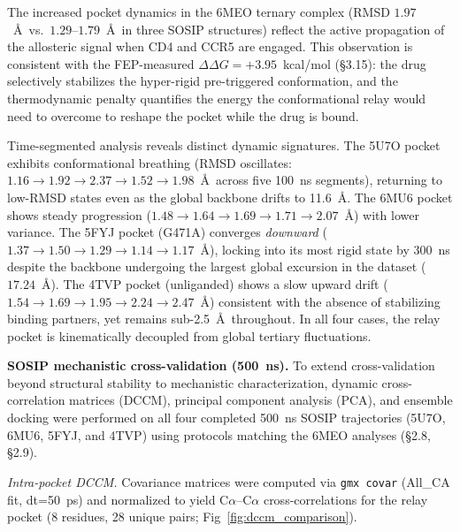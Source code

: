 \documentclass[11pt,a4paper]{article}
\begin{document}
The increased pocket dynamics in the 6MEO ternary complex (RMSD $1.97$~\AA\ vs.\ $1.29$--$1.79$~\AA\ in three SOSIP structures) reflect the active propagation of the allosteric signal when CD4 and CCR5 are engaged. This observation is consistent with the FEP-measured $\Delta\Delta G = +3.95$~kcal/mol (\S3.15): the drug selectively stabilizes the hyper-rigid pre-triggered conformation, and the thermodynamic penalty quantifies the energy the conformational relay would need to overcome to reshape the pocket while the drug is bound.

Time-segmented analysis reveals distinct dynamic signatures. The 5U7O pocket exhibits conformational breathing (RMSD oscillates: $1.16 \to 1.92 \to 2.37 \to 1.52 \to 1.98$~\AA\ across five 100~ns segments), returning to low-RMSD states even as the global backbone drifts to 11.6~\AA. The 6MU6 pocket shows steady progression ($1.48 \to 1.64 \to 1.69 \to 1.71 \to 2.07$~\AA) with lower variance. The 5FYJ pocket (G471A) converges \textit{downward} ($1.37 \to 1.50 \to 1.29 \to 1.14 \to 1.17$~\AA), locking into its most rigid state by 300~ns despite the backbone undergoing the largest global excursion in the dataset ($17.24$~\AA). The 4TVP pocket (unliganded) shows a slow upward drift ($1.54 \to 1.69 \to 1.95 \to 2.24 \to 2.47$~\AA) consistent with the absence of stabilizing binding partners, yet remains sub-2.5~\AA\ throughout. In all four cases, the relay pocket is kinematically decoupled from global tertiary fluctuations.

\textbf{SOSIP mechanistic cross-validation (500~ns).} To extend cross-validation beyond structural stability to mechanistic characterization, dynamic cross-correlation matrices (DCCM), principal component analysis (PCA), and ensemble docking were performed on all four completed 500~ns SOSIP trajectories (5U7O, 6MU6, 5FYJ, and 4TVP) using protocols matching the 6MEO analyses (\S2.8, \S2.9).

\textit{Intra-pocket DCCM.} Covariance matrices were computed via \texttt{gmx covar} (All\_CA fit, dt=50~ps) and normalized to yield C$\alpha$--C$\alpha$ cross-correlations for the relay pocket (8 residues, 28 unique pairs; Fig~\ref{fig:dccm_comparison}).
\end{document}
